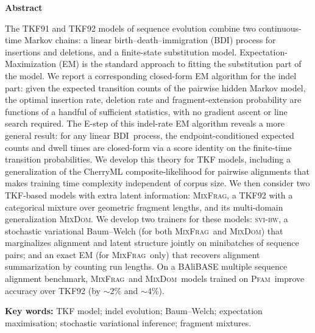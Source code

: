 \documentclass[11pt]{article}
\newcommand{\MixFrag}{\textsc{MixFrag}}
\newcommand{\MixDom}{\textsc{MixDom}}
\newcommand{\BDI}{\textsc{BDI}}
\newcommand{\Pfam}{\textsc{Pfam}}
\newcommand{\svibw}{\textsc{svi-bw}}
\begin{document}
\begin{singlespace}
\noindent\textbf{Abstract}

\noindent The TKF91 and TKF92 models of sequence evolution combine two continuous-time Markov chains: a linear
birth--death--immigration (\BDI) process for insertions and deletions,
and a finite-state substitution model.
Expectation-Maximization (EM) is the standard approach to fitting the substitution part of the model.
We report a corresponding closed-form EM algorithm for the indel part:
given the expected transition counts of the pairwise hidden
Markov model, the optimal insertion rate, deletion rate and
fragment-extension probability are functions of a handful of
sufficient statistics, with no gradient ascent or line search required.
The E-step of this indel-rate EM algorithm reveals a more general result: for any linear
\BDI\ process, the endpoint-conditioned expected
counts and dwell times are closed-form via a score identity on the
finite-time transition probabilities.
We develop this theory for TKF models, including a generalization of the CherryML composite-likelihood for pairwise alignments that makes training time complexity independent of corpus size.
We then consider two TKF-based models with extra latent information:
\MixFrag, a TKF92 with a categorical mixture over geometric fragment
lengths, %
and its multi-domain generalization \MixDom. 
We develop two trainers for these models: \svibw, a stochastic variational Baum--Welch 
(for both \MixFrag\ and \MixDom) that marginalizes alignment and latent structure 
jointly on minibatches of sequence pairs; and an exact EM (for \MixFrag\ only) 
that recovers alignment summarization by counting run lengths.
On a BAliBASE multiple sequence alignment benchmark,
\MixFrag\ and \MixDom\ models trained on \Pfam\ improve accuracy over TKF92 (by ${\sim}2\%$ and ${\sim}4\%$).

\vspace{1em}
\noindent\textbf{Key words:} TKF model; indel evolution; Baum--Welch; expectation maximisation; stochastic variational inference; fragment mixtures.
\end{singlespace}
\end{document}
